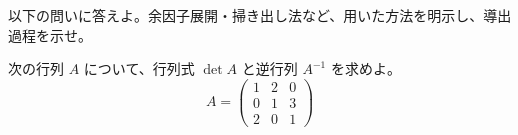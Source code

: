 
以下の問いに答えよ。余因子展開・掃き出し法など、用いた方法を明示し、導出過程を示せ。

次の行列 $A$ について、行列式 $\det A$ と逆行列 $A^{-1}$ を求めよ。
\[
A =
\begin{pmatrix}
1 & 2 & 0 \\
0 & 1 & 3 \\
2 & 0 & 1
\end{pmatrix}
\]

